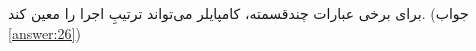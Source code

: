 \section{}
\paragraph{}\label{hint:49}
برای برخی عبارات چندقسمته، کامپایلر می‌تواند ترتیبِ اجرا را معین کند. (جواب \ref{answer:26})